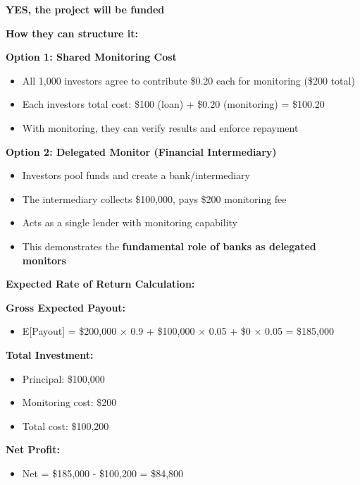 \documentclass[a4paper]{article}
\begin{document}
\textbf{YES, the project will be funded}

\textbf{How they can structure it:}

\textbf{Option 1: Shared Monitoring Cost}

\begin{itemize}
\item
  All 1,000 investors agree to contribute \$0.20 each for monitoring
  (\$200 total)
\item
  Each investor\textquotesingle s total cost: \$100 (loan) + \$0.20
  (monitoring) = \$100.20
\item
  With monitoring, they can verify results and enforce repayment
\end{itemize}

\textbf{Option 2: Delegated Monitor (Financial Intermediary)}

\begin{itemize}
\item
  Investors pool funds and create a bank/intermediary
\item
  The intermediary collects \$100,000, pays \$200 monitoring fee
\item
  Acts as a single lender with monitoring capability
\item
  This demonstrates the \textbf{fundamental role of banks as delegated
  monitors}
\end{itemize}

\textbf{Expected Rate of Return Calculation:}

\textbf{Gross Expected Payout:}

\begin{itemize}
\item
  E{[}Payout{]} = \$200,000 × 0.9 + \$100,000 × 0.05 + \$0 × 0.05 =
  \$185,000
\end{itemize}

\textbf{Total Investment:}

\begin{itemize}
\item
  Principal: \$100,000
\item
  Monitoring cost: \$200
\item
  Total cost: \$100,200
\end{itemize}

\textbf{Net Profit:}

\begin{itemize}
\item
  Net = \$185,000 - \$100,200 = \$84,800
\end{itemize}
\end{document}
